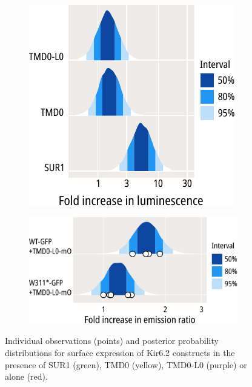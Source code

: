 \begin{figure}[hbtp]
\begin{subfigure}[t]{0.4\textwidth}
	\end{subfigure}
	\vfill
	\begin{subfigure}[t]{0.4\textwidth}
		\caption{}\label{ch6fig:tmd0s_surface_expression_3}
		\centering
		\includegraphics[width=\textwidth]{tmd0s_surface_expression_2.pdf}
	\end{subfigure}
	\hfill
	\begin{subfigure}[t]{0.5\textwidth}
		\caption{}\label{ch6fig:gfp_ofp_contrasts_2}
		\centering
		\includegraphics[width=\textwidth]{gfp_ofp_contrasts_2.pdf}
	\end{subfigure}
	\caption[TMD0 and TMD0-LO associate with WT-GFP and W311*-GFP]{
	{\bf{}}
	 Individual observations (points) and posterior probability distributions for surface expression of Kir6.2 constructs in the presence of SUR1 (green), TMD0 (yellow), TMD0-L0 (purple) or alone (red).
}
\end{figure}
